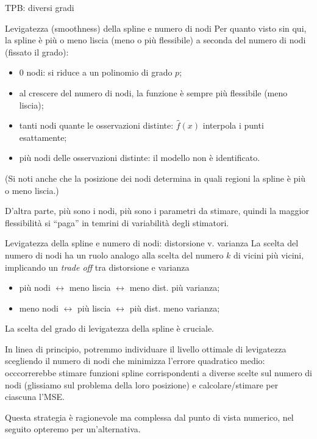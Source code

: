 \documentclass{beamer}\usepackage[]{graphicx}\usepackage[]{color}
\makeatletter
\newenvironment{kframe}{%
 \def\at@end@of@kframe{}%
 \ifinner\ifhmode%
  \def\at@end@of@kframe{\end{minipage}}%
  \begin{minipage}{\columnwidth}%
 \fi\fi%
 \def\FrameCommand##1{\hskip\@totalleftmargin \hskip-\fboxsep
 \colorbox{shadecolor}{##1}\hskip-\fboxsep
     \hskip-\linewidth \hskip-\@totalleftmargin \hskip\columnwidth}%
 \MakeFramed {\advance\hsize-\width
   \@totalleftmargin\z@ \linewidth\hsize
   \@setminipage}}%
 {\par\unskip\endMakeFramed%
 \at@end@of@kframe}
\newenvironment{knitrout}{}{} %
\newcommand{\spazio}{\noindent\makebox[\linewidth]{\resizebox{0.1\linewidth}{1pt}{{$\bullet$}}}}
\makeatother
\begin{document}
\begin{frame}[fragile]{TPB: diversi gradi}
\begin{knitrout}
\color{fgcolor}\begin{kframe}


{\ttfamily\noindent\bfseries{}}\end{kframe}
\end{knitrout}
\end{frame}


\begin{frame}{Levigatezza (smoothness) della spline e numero di nodi}
Per quanto visto sin qui, la spline \`e pi\`u o meno liscia (meno o pi\`u flessibile) a seconda del numero di nodi (fissato il grado): 
\begin{itemize}
\item 0 nodi: si riduce a un polinomio di grado $p$;
\item al crescere del numero di nodi, la funzione \`e sempre pi\`u flessibile (meno liscia);
\item tanti nodi quante le osservazioni distinte: $\hat{f}(x)$ interpola i punti esattamente;
\item pi\`u nodi delle osservazioni distinte: il modello non \`e identificato.
\end{itemize}
(Si noti anche che la posizione dei nodi determina in quali regioni la spline \`e pi\`u o meno liscia.)

\spazio

D'altra parte, pi\`u sono i nodi, pi\`u sono i parametri da stimare, quindi la maggior flessibilit\`a si ``paga'' in temrini di variabilit\`a degli stimatori.
\end{frame}

\begin{frame}{Levigatezza della spline e numero di nodi: distorsione v. varianza}
La scelta del numero di nodi ha un ruolo analogo alla scelta del numero $k$ di vicini pi\`u vicini, implicando un {\it trade off} tra distorsione e varianza
\begin{itemize}
\item pi\`u nodi $\leftrightarrow$ meno liscia $\leftrightarrow$ meno dist. pi\`u varianza;
\item meno nodi $\leftrightarrow$ pi\`u liscia $\leftrightarrow$ pi\`u dist. meno varianza;
\end{itemize}
La scelta del grado di levigatezza della spline \`e cruciale.

\spazio

In linea di principio, potremmo individuare il livello ottimale di levigatezza scegliendo il numero di nodi che minimizza l'errore quadratico medio: occcorrerebbe stimare funzioni spline corrispondenti a diverse scelte sul numero di nodi (glissiamo sul problema della loro posizione) e calcolare/stimare per ciascuna l'MSE.

\spazio

Questa strategia \`e ragionevole ma complessa dal punto di vista numerico, nel seguito opteremo per un'alternativa.
\end{frame}
\end{document}
